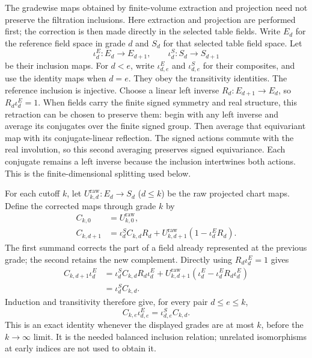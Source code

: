 The gradewise maps obtained by finite-volume extraction and projection need
not preserve the filtration inclusions. Here extraction and
projection are performed first; the correction is then made directly in the
selected table fields. Write $E_d$ for the reference field space in grade
$d$ and $S_d$ for that selected table field space. Let
\[
 \iota^E_d:E_d\longrightarrow E_{d+1},\qquad
 \iota^S_d:S_d\longrightarrow S_{d+1}
\]
be their inclusion maps. For $d<e$, write $\iota^E_{d,e}$ and
$\iota^S_{d,e}$ for their composites, and use the identity maps when $d=e$.
They obey the transitivity identities. The reference inclusion is injective. Choose a linear left
inverse $R_d:E_{d+1}\to E_d$, so $R_d\iota^E_d=1$. When fields carry the
finite signed symmetry and real structure, this retraction can be chosen to
preserve them: begin with any left inverse and average its conjugates over
the finite signed group. Then average that equivariant map with its
conjugate-linear reflection. The signed actions commute with the real
involution, so this second averaging preserves signed equivariance. Each
conjugate remains a left inverse because the inclusion intertwines both
actions. This is the finite-dimensional splitting used below.

For each cutoff $k$, let $U^{\mathrm{raw}}_{k,d}:E_d\to S_d$ ($d\le k$) be the raw
projected chart maps. Define the corrected maps through grade $k$ by
\begin{align}
 C_{k,0}&=U^{\mathrm{raw}}_{k,0},\\
 C_{k,d+1}&=\iota^S_d C_{k,d}R_d
       +U^{\mathrm{raw}}_{k,d+1}(1-\iota^E_dR_d).
 \label{eq:ex-trace-corrected-lift}
\end{align}
The first summand corrects the part of a field already represented at the
previous grade; the second retains the new complement. Directly using
$R_d\iota^E_d=1$ gives
\begin{align*}
 C_{k,d+1}\iota^E_d
 &=\iota^S_d C_{k,d}R_d\iota^E_d
   +U^{\mathrm{raw}}_{k,d+1}(\iota^E_d-\iota^E_dR_d\iota^E_d)\\
 &=\iota^S_d C_{k,d}.
\end{align*}
Induction and transitivity therefore give, for every pair $d\le e\le k$,
\begin{equation}
 C_{k,e}\iota^E_{d,e}=\iota^S_{d,e}C_{k,d}.
 \label{eq:ex-trace-corrected-balanced}
\end{equation}
This is an exact identity whenever the displayed grades are at most $k$, before the $k\to\infty$
limit. It is the needed balanced inclusion relation; unrelated
isomorphisms at early indices are not used to obtain it.

